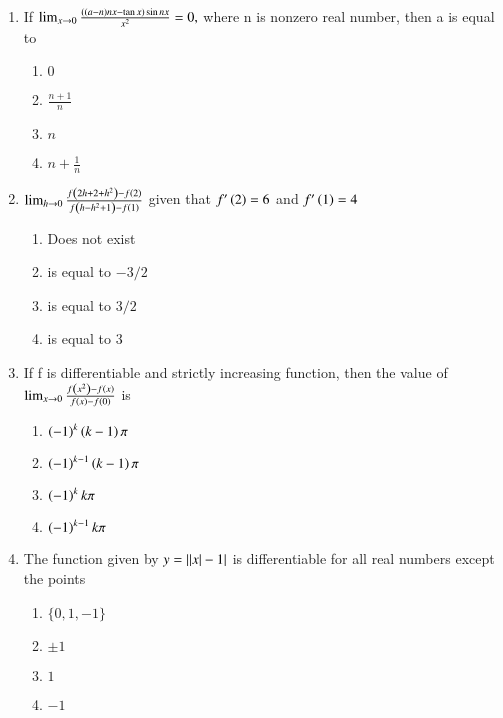 \documentclass[journal,12pt,onecolumn]{IEEEtran}
\theoremstyle{remark}
\begin{document}
\begin{enumerate}
\item %

	If $\lim_{x \to 0} \frac{\left(\left(a-n\right)nx-\tan x\right)\sin nx}{x^2} =0,$ where n is nonzero real number, then a is equal to\hfill{}
    \begin{enumerate}
     \item $0$
     \item $\frac{n+1}{n}$
     \item $n$
     \item $n+\frac{1}{n}$\\
    \end{enumerate}


\item %

	$\lim_{h \to 0} \frac{f\left(2h+2+h^2\right)-f\left(2\right)}{f\left(h-h^2+1\right)-f\left(1\right)}$ given that $f'\left(2\right)=6$ and $f'\left(1\right)=4$ \hfill{}
    \begin{enumerate}
     \item Does not exist
     \item is equal to $-3/2$
     \item is equal to $3/2$
     \item is equal to $3$\\
    \end{enumerate}


\item %

	If f is differentiable and strictly increasing function, then the value of $\lim_{x \to 0} \frac{f\left(x^2\right)-f\left(x\right)}{f\left(x\right)-f\left(0\right)}$ is \hfill{}
    \begin{enumerate}
	    \item $\left(-1\right)^k \left(k-1\right) \pi$
	    \item $\left(-1\right)^{k-1} \left(k-1\right) \pi$
	    \item $\left(-1\right)^k k\pi$
            \item $\left(-1\right)^{k-1} k\pi$\\
    \end{enumerate}


\item %

	The function given by $y=\left\vert\left\vert x\right\vert-1\right\vert$ is differentiable for all real numbers except the points \hfill{}
    \begin{enumerate}
     \item $\{0,1,-1\}$
     \item $\pm 1$
     \item $1$
     \item $-1$\\
    \end{enumerate}


\end{enumerate}
\end{document}
